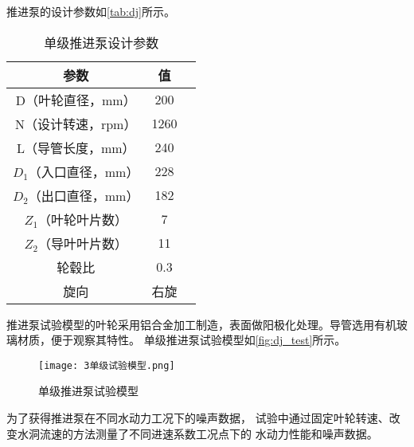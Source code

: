 推进泵的设计参数如\autoref{tab:dj}所示。
\begin{table}[htbp]
    \centering
    \caption{\label{tab:dj}单级推进泵设计参数}
    \begin{tabular}{ccc}
     \toprule
     参数&值\\
     \midrule
     D（叶轮直径，mm）&200\\
     N（设计转速，rpm）&1260\\
     L（导管长度，mm）&240\\
     $D_1$（入口直径，mm）&228\\
     $D_2$（出口直径，mm）&182\\
     $Z_1$（叶轮叶片数）&7\\
     $Z_2$（导叶叶片数）&11\\
     轮毂比&0.3\\
     旋向&右旋\\
     \bottomrule
    \end{tabular}
\end{table}
推进泵试验模型的叶轮采用铝合金加工制造，表面做阳极化处理。导管选用有机玻璃材质，便于观察其特性。
单级推进泵试验模型如\autoref{fig:dj_test}所示。
\begin{figure}[htbp]
    \centering
    \texttt{[image: 3单级试验模型.png]}
    \caption{\label{fig:dj_test}单级推进泵试验模型}
\end{figure}
为了获得推进泵在不同水动力工况下的噪声数据，
试验中通过固定叶轮转速、改变水洞流速的方法测量了不同进速系数工况点下的
水动力性能和噪声数据。

